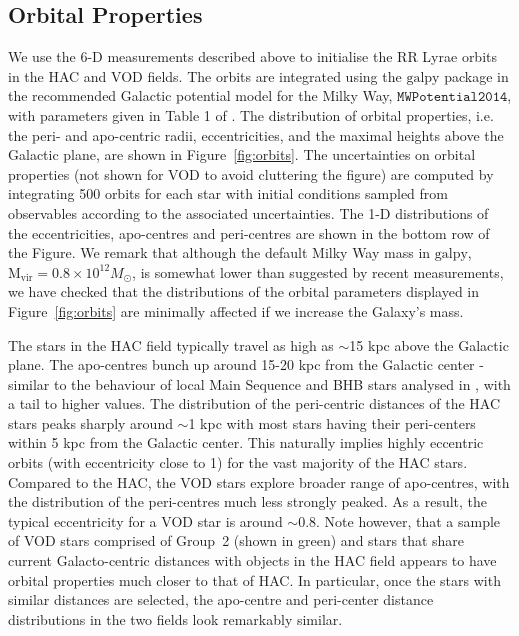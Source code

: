 \documentclass[fleqn,usenatbib]{mnras}
\begin{document}
\subsection{Orbital Properties}

We use the 6-D measurements described above to initialise the RR Lyrae
orbits in the HAC and VOD fields. The orbits are integrated using the
$\mathrm{galpy}$ package \citep{Bovy2015} in the recommended Galactic
potential model for the Milky Way, $\texttt{MWPotential2014}$, with
parameters given in Table 1 of \citet{Bovy2015}. The distribution of 
orbital
properties, i.e. the peri- and apo-centric radii, eccentricities, and
the maximal heights above the Galactic plane, are shown in
Figure~\ref{fig:orbits}. The uncertainties on orbital properties
(not shown for VOD to avoid cluttering the figure) are computed by 
integrating 500 orbits for each star with 
initial conditions sampled from observables according to
the associated uncertainties. The 1-D distributions of the
eccentricities, apo-centres and peri-centres are shown in the bottom
row of the Figure.  We remark that although the default Milky Way mass in
$\mathrm{galpy}$, $\mathrm{M_{vir}} = 0.8 \times 10^{12} M_{\odot}$,
is somewhat lower than suggested by recent measurements, we have
checked that the distributions of the orbital parameters
displayed in Figure~\ref{fig:orbits} are minimally affected if we
increase the Galaxy's mass.

The stars in the HAC field typically travel as high as $\sim$15 kpc
above the Galactic plane. The apo-centres bunch up around 15-20 kpc
from the Galactic center - similar to the behaviour of local Main
Sequence and BHB stars analysed in \citet{Deason2018pileup}, with a
tail to higher values. The distribution of the peri-centric distances
of the HAC stars peaks sharply around $\sim$1 kpc with most stars
having their peri-centers within 5 kpc from the Galactic center. This
naturally implies highly eccentric orbits (with eccentricity close to
1) for the vast majority of the HAC stars. Compared to the HAC, the
VOD stars explore broader range of apo-centres, with the distribution
of the peri-centres much less strongly peaked. As a result, the
typical eccentricity for a VOD star is around $\sim$0.8. Note however,
that a sample of VOD stars comprised of Group~2 (shown in green) and
stars that share current Galacto-centric distances with objects
in the HAC field appears to have orbital properties much closer to
that of HAC. In particular, once the stars with similar distances are
selected, the apo-centre and peri-center distance distributions in the
two fields look remarkably similar.
\end{document}
